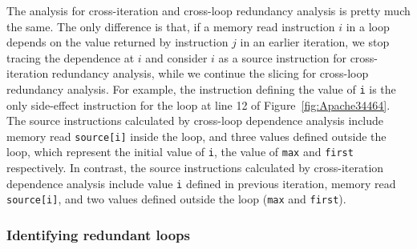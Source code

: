 

The analysis for cross-iteration and cross-loop redundancy analysis is pretty
much the same. The only difference is that, if a memory read instruction 
$i$ in a loop depends on the value returned by instruction $j$ in an earlier
iteration, we stop tracing the dependence at $i$ and consider $i$ as a
source instruction for cross-iteration redundancy analysis, while we continue
the slicing for cross-loop redundancy analysis. 
For example, 
the instruction defining the value of \texttt{i} is the only side-effect instruction 
for the loop at line 12 of Figure~\ref{fig:Apache34464}. 
The source instructions calculated by cross-loop dependence analysis include 
memory read \texttt{source[i]} inside the loop, 
and three values defined outside the loop, 
which represent the initial value of \texttt{i}, the value of \texttt{max} and \texttt{first} respectively. 
In contrast, 
the source instructions calculated by cross-iteration dependence analysis 
include value \texttt{i} defined in previous iteration, 
memory read \texttt{source[i]}, 
and two values defined outside the loop (\texttt{max} and \texttt{first}).  


\subsubsection{Identifying redundant loops}
\label{sec:cal}

